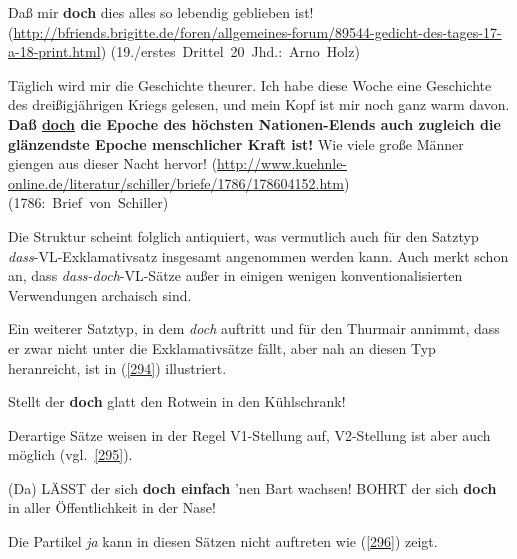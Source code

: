\begin{exe}
	\ex\label{292} 

		Daß mir \textbf{doch} dies alles so lebendig geblieben ist!
			\newline
			{\scriptsize(\url{http://bfriends.brigitte.de/foren/allgemeines-forum/89544-gedicht-des-tages-17-a-18-print.html})}
			\newline
			\hbox{}\hfill\hbox{(19./erstes Drittel 20 Jhd.: Arno Holz)}		 
\end{exe}
			   
\begin{exe}
	\ex\label{293} 

		Täglich wird mir die Geschichte theurer. Ich habe diese Woche eine Geschichte des dreißigjährigen Kriegs gelesen, und mein Kopf ist mir noch ganz warm davon. \textbf{Daß \underline{doch} die Epoche des höchsten Nationen-Elends auch zugleich die glänzendste Epoche menschlicher Kraft ist!} Wie viele große Männer giengen aus dieser Nacht hervor! 		
			\newline
			{\scriptsize(\url{http://www.kuehnle-online.de/literatur/schiller/briefe/1786/178604152.htm}) }
			\newline
			\hbox{}\hfill\hbox{(1786: Brief von Schiller)}			
\end{exe}
Die Struktur scheint folglich antiquiert, was vermutlich auch für den Satztyp \textit{dass}-VL-Exklamativsatz insgesamt angenommen werden kann. Auch \citet[140]{Hentschel1986} merkt schon an, dass \textit{dass-doch}-VL-Sätze außer in einigen wenigen konventionalisierten Verwendungen archaisch sind.

Ein weiterer Satztyp, in dem \textit{doch} auftritt und für den Thurmair annimmt, dass er zwar nicht unter die Exklamativsätze fällt, aber nah an diesen Typ heranreicht, ist in (\ref{294}) illustriert.

\begin{exe}
	\ex\label{294} 
	Stellt der \textbf{doch} glatt den Rotwein in den Kühlschrank!
	\newline
	\hbox{}\hfill\hbox{\citet[115]{Thurmair1989}}
\end{exe}
Derartige Sätze weisen in der Regel V1-Stellung auf, V2-Stellung ist aber auch möglich (vgl.\ \ref{295}).

\begin{exe}
	\ex\label{295} 
		\begin{xlist}	
			\ex\label{295a} (Da) LÄSST der sich \textbf{doch einfach} 'nen Bart wachsen!
			\ex\label{295b} BOHRT der sich \textbf{doch} in aller Öffentlichkeit in der Nase!
			\newline
			\hbox{}\hfill\hbox{\citet[217]{Rinas2006}}
		\end{xlist}
\end{exe}
Die Partikel \textit{ja} kann in diesen Sätzen nicht auftreten wie (\ref{296}) zeigt.

